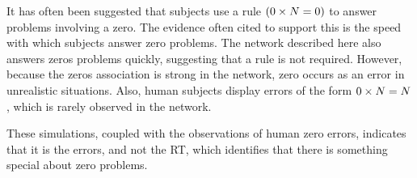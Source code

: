\begin{multicols}{3}[\showtitle]

It has often been suggested that subjects use a rule $(\mbox{$0\times N$}=0)$ to answer
problems involving a zero.  The evidence often cited to support this is the
speed with which subjects answer zero problems.  The network described
here also answers zeros problems quickly, suggesting that a rule is not
required. However, because the zeros association is strong in the network,
zero occurs as an error in unrealistic situations.  Also, human
subjects display errors of the form $\mbox{$0\times N$}=N$, which is rarely observed in
the network.

These simulations, coupled with the observations of human zero errors,
indicates that it is the errors, and not the RT, which identifies that
there is something special about zero problems.

%
\end{multicols}

